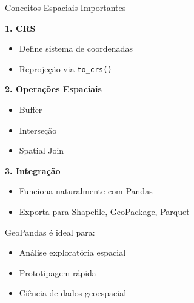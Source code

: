 \documentclass{beamer}
\begin{document}
\begin{frame}{Conceitos Espaciais Importantes}
    
    \textbf{1. CRS}
    \begin{itemize}
        \item Define sistema de coordenadas
        \item Reprojeção via \texttt{to\_crs()}
    \end{itemize}
    
    \vspace{0.3cm}
    
    \textbf{2. Operações Espaciais}
    \begin{itemize}
        \item Buffer
        \item Interseção
        \item Spatial Join
    \end{itemize}
    
    \vspace{0.3cm}
    
    \textbf{3. Integração}
    \begin{itemize}
        \item Funciona naturalmente com Pandas
        \item Exporta para Shapefile, GeoPackage, Parquet
    \end{itemize}
    
    \vspace{0.3cm}
    
    GeoPandas é ideal para:
    \begin{itemize}
        \item Análise exploratória espacial
        \item Prototipagem rápida
        \item Ciência de dados geoespacial
    \end{itemize}
    
\end{frame}
\end{document}
